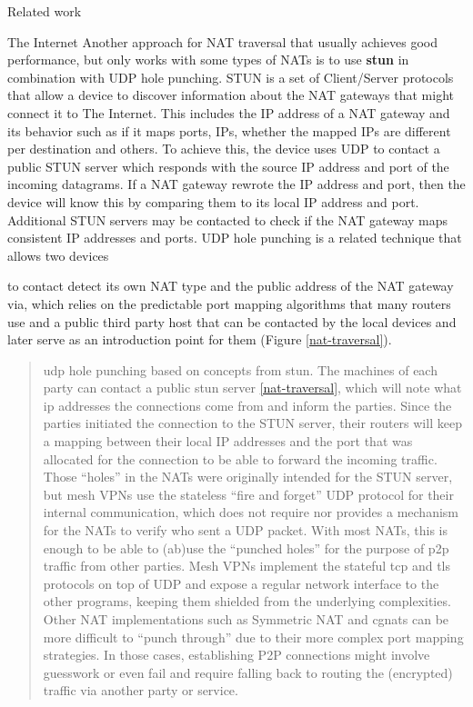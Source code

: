 \begin{frame}[fragile]{Related work}
\begin{block}{The Internet}
Another approach for NAT traversal that usually achieves good
performance, but only works with some types of NATs is to use
\textbf{\gls{stun}} in combination with UDP hole punching. STUN is a set
of Client/Server protocols that allow a device to discover information
about the NAT gateways that might connect it to The Internet. This
includes the IP address of a NAT gateway and its behavior such as if it
maps ports, IPs, whether the mapped IPs are different per destination
and others. To achieve this, the device uses UDP to contact a public
STUN server which responds with the source IP address and port of the
incoming datagrams. If a NAT gateway rewrote the IP address and port,
then the device will know this by comparing them to its local IP address
and port. Additional STUN servers may be contacted to check if the NAT
gateway maps consistent IP addresses and ports. UDP hole punching is a
related technique that allows two devices

to contact detect its own NAT type and the public address of the NAT
gateway via, which relies on the predictable port mapping algorithms
that many routers use and a public third party host that can be
contacted by the local devices and later serve as an introduction point
for them (Figure \ref{nat-traversal}).


\begin{quote}
\gls{udp} hole punching based on concepts from \gls{stun}. The machines
of each party can contact a public \gls{stun} server
\ref{nat-traversal}, which will note what \gls{ip} addresses the
connections come from and inform the parties. Since the parties
initiated the connection to the STUN server, their routers will keep a
mapping between their local IP addresses and the port that was allocated
for the connection to be able to forward the incoming traffic. Those
``holes'' in the NATs were originally intended for the STUN server, but
mesh VPNs use the stateless ``fire and forget'' UDP protocol for their
internal communication, which does not require nor provides a mechanism
for the NATs to verify who sent a UDP packet. With most NATs, this is
enough to be able to (ab)use the ``punched holes'' for the purpose of
\gls{p2p} traffic from other parties. Mesh VPNs implement the stateful
\gls{tcp} and \gls{tls} protocols on top of UDP and expose a regular
network interface to the other programs, keeping them shielded from the
underlying complexities. Other NAT implementations such as Symmetric NAT
and \glspl{cgnat} can be more difficult to ``punch through'' due to
their more complex port mapping strategies. In those cases, establishing
P2P connections might involve guesswork or even fail and require falling
back to routing the (encrypted) traffic via another party or service.
\end{quote}


\end{block}
\end{frame}
